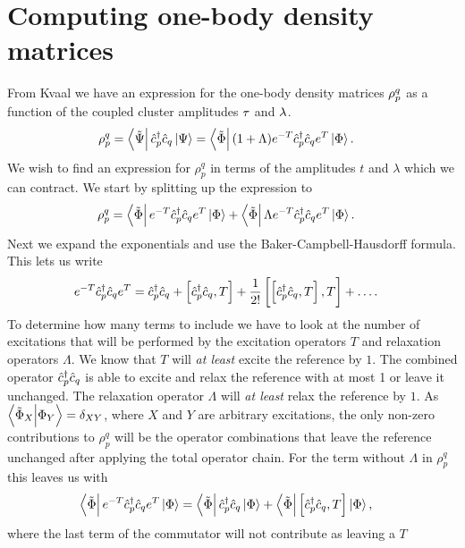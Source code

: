 \chapter{Computing one-body density matrices}
    From Kvaal \cite{kvaal2012ab} we have an expression for the one-body density
    matrices $\rho^q_p$ as a function of the coupled cluster amplitudes
    $\tau$ and $\lambda$.
    \begin{align}
        \rho^{q}_{p}
        &= \bra{\tilde{\Psi}}\hat{c}_{p}^{\dagger}\hat{c}_{q}\ket{\Psi}
        = \bra{\tilde{\Phi}}(1 + \Lambda)e^{-T}\hat{c}_{p}^{\dagger}\hat{c}_{q}e^T\ket{\Phi}.
    \end{align}
    We wish to find an expression for $\rho^{q}_{p}$ in terms of the amplitudes
    $t$ and $\lambda$ which we can contract. We start by splitting up the
    expression to
    \begin{align}
        \rho^q_p
        &= \bra{\tilde{\Phi}}e^{-T}\hat{c}_{p}^{\dagger}\hat{c}_{q}e^T\ket{\Phi}
        + \bra{\tilde{\Phi}}\Lambda e^{-T}\hat{c}_{p}^{\dagger}\hat{c}_{q}e^T\ket{\Phi}.
    \end{align}
    Next we expand the exponentials and use the Baker-Campbell-Hausdorff
    formula. This lets us write
    \begin{align}
        e^{-T}\hat{c}_{p}^{\dagger}\hat{c}_{q}e^T
        &= \hat{c}_{p}^{\dagger}\hat{c}_{q}
        + \left[\hat{c}_{p}^{\dagger}\hat{c}_{q}, T\right]
        + \frac{1}{2!}\left[\left[\hat{c}_{p}^{\dagger}\hat{c}_{q}, T\right], T\right]
        + \dots.
    \end{align}
    To determine how many terms to include we have to look at the number of
    excitations that will be performed by the excitation operators $T$ and
    relaxation operators $\Lambda$. We know that $T$ will \textit{at least}
    excite the reference by $1$. The combined operator $\hat{c}_{p}^{\dagger}\hat{c}_{q}$ is able
    to excite and relax the reference with at most 1 or leave it unchanged. The
    relaxation operator $\Lambda$ will \textit{at least} relax the reference by
    $1$. As $\braket{\tilde{\Phi}_X}{\Phi_Y} = \delta_{XY}$, where $X$ and $Y$
    are arbitrary excitations, the only non-zero contributions to $\rho^q_p$
    will be the operator combinations that leave the reference unchanged after
    applying the total operator chain. For the term without $\Lambda$ in
    $\rho^q_p$ this leaves us with
    \begin{align}
        \bra{\tilde{\Phi}}e^{-T}\hat{c}_{p}^{\dagger}\hat{c}_{q}e^T\ket{\Phi}
        &= \bra{\tilde{\Phi}}\hat{c}_{p}^{\dagger}\hat{c}_{q}\ket{\Phi}
        + \bra{\tilde{\Phi}}\left[\hat{c}_{p}^{\dagger}\hat{c}_{q}, T\right]\ket{\Phi},
    \end{align}
    where the last term of the commutator will not contribute as leaving a $T$
